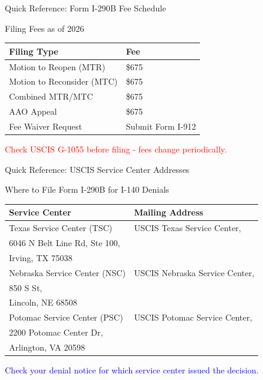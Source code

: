 \documentclass[11pt]{beamer}
\begin{document}
	
	\begin{frame}{Quick Reference: Form I-290B Fee Schedule}
		\scriptsize
		\begin{block}{Filing Fees as of 2026}
			\centering
			\begin{tabular}{|p{5cm}|p{3cm}|}
				\hline
				\textbf{Filing Type} & \textbf{Fee} \\
				\hline
				Motion to Reopen (MTR) & \$675 \\
				\hline
				Motion to Reconsider (MTC) & \$675 \\
				\hline
				Combined MTR/MTC & \$675 \\
				\hline
				AAO Appeal & \$675 \\
				\hline
				Fee Waiver Request & Submit Form I-912 \\
				\hline
			\end{tabular}
			\vspace{0.2cm}
			\textcolor{red}{Check USCIS G-1055 before filing - fees change periodically.}
		\end{block}
	\end{frame}
	
	\begin{frame}{Quick Reference: USCIS Service Center Addresses}
		\scriptsize
		\begin{block}{Where to File Form I-290B for I-140 Denials}
			\centering
			\begin{tabular}{|p{4cm}|p{5cm}|}
				\hline
				\textbf{Service Center} & \textbf{Mailing Address} \\
				\hline
				Texas Service Center (TSC) & USCIS Texas Service Center,\\ 6046 N Belt Line Rd, Ste 100,\\ Irving, TX 75038 \\
				\hline
				Nebraska Service Center (NSC) & USCIS Nebraska Service Center,\\ 850 S St,\\ Lincoln, NE 68508 \\
				\hline
				Potomac Service Center (PSC) & USCIS Potomac Service Center,\\ 2200 Potomac Center Dr,\\ Arlington, VA 20598 \\
				\hline
			\end{tabular}
			\vspace{0.2cm}
			\textcolor{blue}{Check your denial notice for which service center issued the decision.}
		\end{block}
	\end{frame}
	
\end{document}
